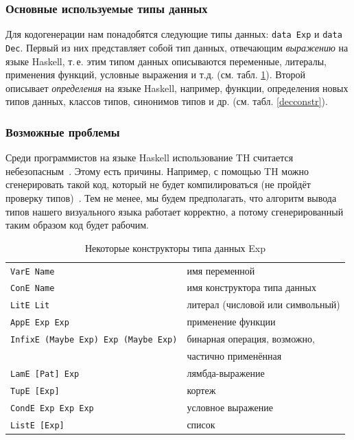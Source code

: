 	\subsubsection{Основные используемые типы данных} Для кодогенерации нам понадобятся следующие типы данных: \lstinline!data Exp! и \lstinline!data Dec!. Первый из них представляет собой тип данных, отвечающим \textit{выражению} на языке Haskell, т.\,е. этим типом данных описываются переменные, литералы, применения функций, условные выражения и т.д. (см. табл. \ref{expconstr}). Второй описывает \textit{определения} на языке Haskell, например, функции, определения новых типов данных, классов типов, синонимов типов и др. (см. табл. \ref{decconstr}).
	
	\subsubsection{Возможные проблемы} Среди программистов на языке Haskell использование TH считается небезопасным~\autocite{ugly}. Этому есть причины. Например, с помощью TH можно сгенерировать такой код, который не будет компилироваться (не пройдёт проверку типов)~\autocite{whatsbad}. Тем не менее, мы будем предполагать, что алгоритм вывода типов нашего визуального языка работает корректно, а потому сгенерированный таким образом код будет рабочим.
	
\begin{table}[h]
	\begin{center}
		\begin{tabular}{ll}
			{\lstinline!VarE Name!} & имя переменной \\
			{\lstinline!ConE Name!} & имя конструктора типа данных \\
			{\lstinline!LitE Lit!} & литерал (числовой или символьный) \\
			{\lstinline!AppE Exp Exp!} & применение функции \\
			{\lstinline!InfixE (Maybe Exp) Exp (Maybe Exp)!} & бинарная операция, возможно, \\ & частично применённая \\
			{\lstinline!LamE [Pat] Exp!} & лямбда-выражение \\
			{\lstinline!TupE [Exp]!} & кортеж \\
			{\lstinline!CondE Exp Exp Exp!} & условное выражение \\
			{\lstinline!ListE [Exp]!} & список \\
		\end{tabular}
	\end{center}
\caption{Некоторые конструкторы типа данных Exp}
\label{expconstr}
\end{table}

